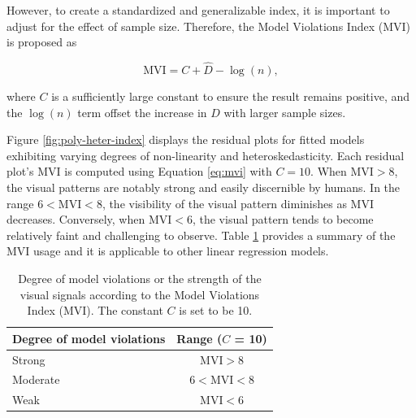 \documentclass[]{interact}
\theoremstyle{plain}%
\theoremstyle{definition}
\theoremstyle{remark}
\begin{document}
However, to create a standardized and generalizable index, it is
important to adjust for the effect of sample size. Therefore, the Model
Violations Index (MVI) is proposed as

\begin{equation} \label{eq:mvi}
\text{MVI} = C + \hat{D} - \log(n),
\end{equation}

\noindent where \(C\) is a sufficiently large constant to ensure the
result remains positive, and the \(\log(n)\) term offset the increase in
\(D\) with larger sample sizes.

Figure \ref{fig:poly-heter-index} displays the residual plots for fitted
models exhibiting varying degrees of non-linearity and
heteroskedasticity. Each residual plot's MVI is computed using Equation
\ref{eq:mvi} with \(C = 10\). When \(\text{MVI} > 8\), the visual
patterns are notably strong and easily discernible by humans. In the
range \(6 < \text{MVI} < 8\), the visibility of the visual pattern
diminishes as MVI decreases. Conversely, when \(\text{MVI} < 6\), the
visual pattern tends to become relatively faint and challenging to
observe. Table \ref{tab:mvi} provides a summary of the MVI usage and it
is applicable to other linear regression models.

\begin{table}

\caption{\label{tab:mvi}Degree of model violations or the strength of the visual signals according to the Model Violations Index (MVI). The constant $C$ is set to be 10.}
\centering
\begin{tabular}[t]{lc}
\toprule
Degree of model violations & Range ($C$ = 10)\\
\midrule
Strong & $\text{MVI} > 8$\\
Moderate & $6 < \text{MVI} < 8$\\
Weak & $\text{MVI} < 6$\\
\bottomrule
\end{tabular}
\end{table}
\end{document}
